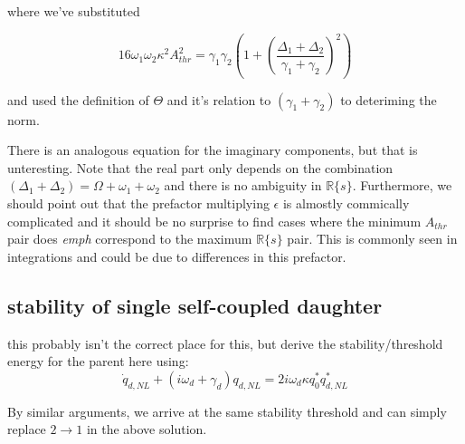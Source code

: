where we've substituted 

\begin{equation}
16\omega_1\omega_2\kappa^2 A_{thr}^2 = \gamma_1\gamma_2 \left( 1 + \left(\frac{\Delta_1+\Delta_2}{\gamma_1+\gamma_2}\right)^2\right)
\end{equation}

and used the definition of $\Theta$ and it's relation to $(\gamma_1+\gamma_2)$ to deteriming the norm.

There is an analogous equation for the imaginary components, but that is unteresting. Note that the real part only depends on the combination $(\Delta_1+\Delta_2)=\Omega+\omega_1+\omega_2$ and there is no ambiguity in $\mathbb{R}\{s\}$. Furthermore, we should point out that the prefactor multiplying $\epsilon$ is almostly commically complicated and it should be no surprise to find cases where the minimum $A_{thr}$ pair does \emph{emph} correspond to the maximum $\mathbb{R}\{s\}$ pair. This is commonly seen in integrations and could be due to differences in this prefactor.


\subsection*{stability of single self-coupled daughter}

this probably isn't the correct place for this, but derive the stability/threshold energy for the parent here using:
\begin{equation}
\dot{q}_{d,NL} + (i\omega_d + \gamma_d)q_{d,NL} = 2i\omega_d \kappa q_0^\ast q_{d,NL}^\ast
\end{equation}

By similar arguments, we arrive at the same stability threshold and can simply replace $2\rightarrow1$ in the above solution.

